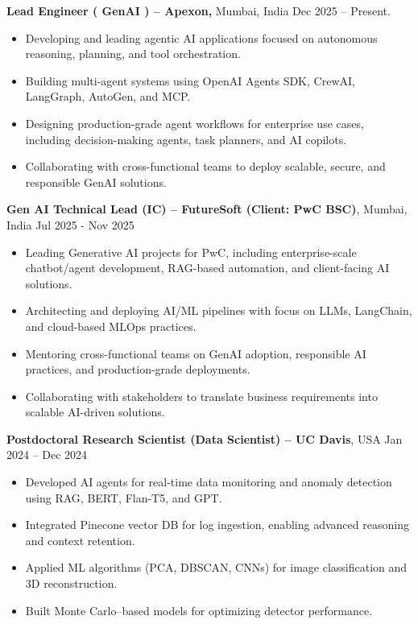 \documentclass[a4paper,10pt]{article}
\begin{document}
\textbf{Lead Engineer ( GenAI ) – Apexon,} Mumbai, India  \hfill Dec 2025 – Present.
\begin{itemize}[leftmargin=0.5cm]

\item Developing and leading agentic AI applications focused on autonomous reasoning, planning, and tool orchestration.
\item  Building multi-agent systems using OpenAI Agents SDK, CrewAI, LangGraph, AutoGen, and MCP.
\item Designing production-grade agent workflows for enterprise use cases, including decision-making agents, task planners, and AI copilots.

\item Collaborating with cross-functional teams to deploy scalable, secure, and responsible GenAI solutions.
\end{itemize}

\textbf{Gen AI Technical Lead (IC) – FutureSoft (Client: PwC BSC)}, Mumbai, India \hfill Jul 2025 - Nov 2025
\begin{itemize}[leftmargin=0.5cm]
  \item Leading Generative AI projects for PwC, including enterprise-scale chatbot/agent development, RAG-based automation, and client-facing AI solutions.
  \item Architecting and deploying AI/ML pipelines with focus on LLMs, LangChain, and cloud-based MLOps practices.
  \item Mentoring cross-functional teams on GenAI adoption, responsible AI practices, and production-grade deployments.
  \item Collaborating with stakeholders to translate business requirements into scalable AI-driven solutions.
\end{itemize}

\textbf{Postdoctoral Research Scientist (Data Scientist) – UC Davis}, USA \hfill Jan 2024 – Dec 2024
\begin{itemize}[leftmargin=0.5cm]
  \item Developed AI agents for real-time data monitoring and anomaly detection using RAG, BERT, Flan-T5, and GPT.
  \item Integrated Pinecone vector DB for log ingestion, enabling advanced reasoning and context retention.
  \item Applied ML algorithms (PCA, DBSCAN, CNNs) for image classification and 3D reconstruction.
  \item Built Monte Carlo–based models for optimizing detector performance.
\end{itemize}
\end{document}
